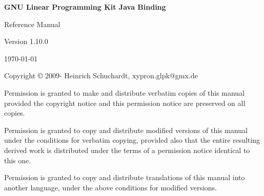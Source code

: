 \documentclass[a4paper,11pt]{report}
\newcommand{\glpkJavaVersion}{1.10.0}
\begin{document}

\thispagestyle{empty}

\begin{center}

\vspace*{1in}

\begin{huge}
\sf\bfseries GNU Linear Programming Kit\linebreak
Java Binding
\end{huge}

\vspace{0.5in}

\begin{LARGE}
\sf Reference Manual
\end{LARGE}

\vspace{0.5in}

\begin{LARGE}
\sf Version \glpkJavaVersion
\end{LARGE}

\vspace{0.5in}
\begin{Large}
\sf \today
\end{Large}
\end{center}

\newpage

\vspace*{1in}

\vfill

\medskip \noindent
Copyright \copyright{} 2009-{\the\year} Heinrich Schuchardt,
xypron.glpk@gmx.de

\medskip \noindent
Permission is granted to make and distribute verbatim copies of this
manual provided the copyright notice and this permission notice are
preserved on all copies.

\medskip \noindent
Permission is granted to copy and distribute modified versions of this
manual under the conditions for verbatim copying, provided also that the
entire resulting derived work is distributed under the terms of
a permission notice identical to this one.

\medskip \noindent
Permission is granted to copy and distribute translations of this manual
into another language, under the above conditions for modified versions.
\end{document}
